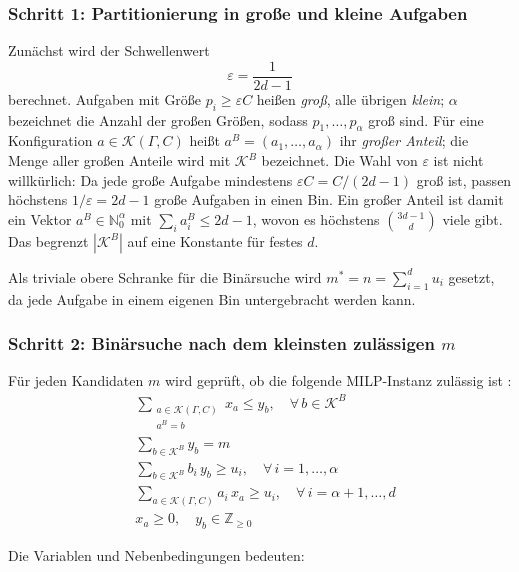\subsubsection{Schritt 1: Partitionierung in große und kleine Aufgaben}

Zunächst wird der Schwellenwert
\[
  \varepsilon = \frac{1}{2d - 1}
\]
berechnet. Aufgaben mit Größe $p_i \ge \varepsilon C$ heißen \emph{groß}, alle übrigen \emph{klein};
$\alpha$ bezeichnet die Anzahl der großen Größen, sodass $p_1, \ldots, p_\alpha$ groß sind.
Für eine Konfiguration $a \in \mathcal{K}(\Gamma, C)$ heißt $a^B = (a_1, \ldots, a_\alpha)$ ihr \emph{großer Anteil};
die Menge aller großen Anteile wird mit $\mathcal{K}^B$ bezeichnet.
Die Wahl von $\varepsilon$ ist nicht willkürlich: Da jede große Aufgabe mindestens
$\varepsilon C = C/(2d-1)$ groß ist, passen höchstens $1/\varepsilon = 2d-1$ große Aufgaben in
einen Bin.
Ein großer Anteil ist damit ein Vektor $a^B \in \mathbb{N}_0^{\alpha}$ mit
$\sum_i a^B_i \le 2d-1$, wovon es höchstens $\binom{3d-1}{d}$ viele gibt.
Das begrenzt $|\mathcal{K}^B|$ auf eine Konstante für festes $d$.

Als triviale obere Schranke für die Binärsuche wird $m^* = n = \sum_{i=1}^{d} u_i$ gesetzt,
da jede Aufgabe in einem eigenen Bin untergebracht werden kann.

\subsubsection{Schritt 2: Binärsuche nach dem kleinsten zulässigen \texorpdfstring{$m$}{m}}

Für jeden Kandidaten $m$ wird geprüft, ob die folgende MILP-Instanz zulässig ist
\cite{jansen_solisoba2010}:
\begin{align*}
	&\sum_{\substack{a \in \mathcal{K}(\Gamma, C) \\ a^B = b}} x_{a} \leq y_b,
	\quad \forall\, b \in \mathcal{K}^B \\
	&\sum_{b \in \mathcal{K}^B} y_b = m  \\
	&\sum_{b \in \mathcal{K}^B} b_i\, y_b \geq u_i, \quad \forall\, i = 1, \ldots, \alpha  \\
	&\sum_{a \in \mathcal{K}(\Gamma, C)} a_i\, x_{a} \geq u_i, \quad \forall\, i = \alpha+1, \ldots, d \\
	&x_{a} \geq 0, \quad y_b \in \mathbb{Z}_{\geq 0} \nonumber
\end{align*}

\noindent Die Variablen und Nebenbedingungen bedeuten:


